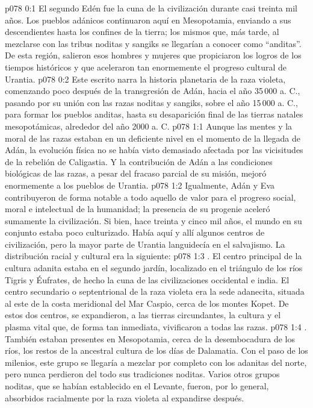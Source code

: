 \author{Arcángel}
\vs p078 0:1 El segundo Edén fue la cuna de la civilización durante casi treinta mil años. Los pueblos adánicos continuaron aquí en Mesopotamia, enviando a sus descendientes hasta los confines de la tierra; los mismos que, más tarde, al mezclarse con las tribus noditas y sangiks se llegarían a conocer como “anditas”. De esta región, salieron esos hombres y mujeres que propiciaron los logros de los tiempos históricos y que aceleraron tan enormemente el progreso cultural de Urantia.
\vs p078 0:2 Este escrito narra la historia planetaria de la raza violeta, comenzando poco después de la transgresión de Adán, hacia el año 35\,000 a. C., pasando por su unión con las razas noditas y sangiks, sobre el año 15\,000 a. C., para formar los pueblos anditas, hasta su desaparición final de las tierras natales mesopotámicas, alrededor del año 2000 a. C.
\vs p078 1:1 Aunque las mentes y la moral de las razas estaban en un deficiente nivel en el momento de la llegada de Adán, la evolución física no se había visto demasiado afectada por las vicisitudes de la rebelión de Caligastia. Y la contribución de Adán a las condiciones biológicas de las razas, a pesar del fracaso parcial de su misión, mejoró enormemente a los pueblos de Urantia.
\vs p078 1:2 Igualmente, Adán y Eva contribuyeron de forma notable a todo aquello de valor para el progreso social, moral e intelectual de la humanidad; la presencia de su progenie aceleró sumamente la civilización. Si bien, hace treinta y cinco mil años, el mundo en su conjunto estaba poco culturizado. Había aquí y allí algunos centros de civilización, pero la mayor parte de Urantia languidecía en el salvajismo. La distribución racial y cultural era la siguiente:
\vs p078 1:3 . El centro principal de la cultura adanita estaba en el segundo jardín, localizado en el triángulo de los ríos Tigris y Éufrates, de hecho la cuna de las civilizaciones occidental e india. El centro secundario o septentrional de la raza violeta era la sede adanecita, situada al este de la costa meridional del Mar Caspio, cerca de los montes Kopet. De estos dos centros, se expandieron, a las tierras circundantes, la cultura y el plasma vital que, de forma tan inmediata, vivificaron a todas las razas.
\vs p078 1:4 . También estaban presentes en Mesopotamia, cerca de la desembocadura de los ríos, los restos de la ancestral cultura de los días de Dalamatia. Con el paso de los milenios, este grupo se llegaría a mezclar por completo con los adanitas del norte, pero nunca perdieron del todo sus tradiciones noditas. Varios otros grupos noditas, que se habían establecido en el Levante, fueron, por lo general, absorbidos racialmente por la raza violeta al expandirse después.
